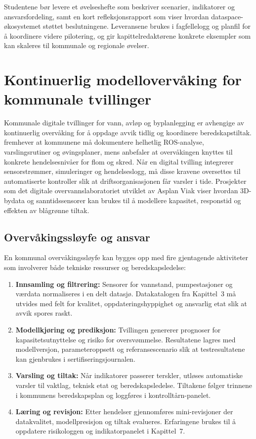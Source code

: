 Studentene bør levere et øvelseshefte som beskriver scenarier, indikatorer og ansvarsfordeling, samt en kort refleksjonsrapport som viser hvordan dataspace-økosystemet støttet beslutningene. Leveransene brukes i fagfellelogg og planfil for å koordinere videre pilotering, og gir kapittelredaktørene konkrete eksempler som kan skaleres til kommunale og regionale øvelser.


\section{Kontinuerlig modellovervåking for kommunale tvillinger}
Kommunale digitale tvillinger for vann, avløp og byplanlegging er avhengige av kontinuerlig overvåking for å oppdage avvik tidlig og koordinere beredskapstiltak. \citet{dsb2022beredskap} fremhever at kommunene må dokumentere helhetlig ROS-analyse, varslingsrutiner og øvingsplaner, mens \citet{nve2022kommunal} anbefaler at overvåkingen knyttes til konkrete hendelsesnivåer for flom og skred. Når en digital tvilling integrerer sensorstrømmer, simuleringer og hendelseslogg, må disse kravene oversettes til automatiserte kontroller slik at driftsorganisasjonen får varsler i tide. Prosjekter som det digitale overvannslaboratoriet utviklet av Asplan Viak viser hvordan 3D-bydata og sanntidssensorer kan brukes til å modellere kapasitet, responstid og effekten av blågrønne tiltak.\citep{asplan2023overvannslab}

\subsection{Overvåkingssløyfe og ansvar}
En kommunal overvåkingssløyfe kan bygges opp med fire gjentagende aktiviteter som involverer både tekniske ressurser og beredskapsledelse:
\begin{enumerate}
    \item \textbf{Innsamling og filtrering:} Sensorer for vannstand, pumpestasjoner og værdata normaliseres i en delt datasjø. Datakatalogen fra Kapittel~3 må utvides med felt for kvalitet, oppdateringshyppighet og ansvarlig etat slik at avvik spores raskt.\citep{nve2022kommunal}
    \item \textbf{Modellkjøring og prediksjon:} Tvillingen genererer prognoser for kapasitetsutnyttelse og risiko for oversvømmelse. Resultatene lagres med modellversjon, parameteroppsett og referansescenario slik at testresultatene kan gjenbrukes i sertifiseringsjournalen.
    \item \textbf{Varsling og tiltak:} Når indikatorer passerer terskler, utløses automatiske varsler til vaktlag, teknisk etat og beredskapsledelse. Tiltakene følger trinnene i kommunens beredskapsplan og loggføres i kontrolltårn-panelet.\citep{dsb2022beredskap}
    \item \textbf{Læring og revisjon:} Etter hendelser gjennomføres mini-revisjoner der datakvalitet, modellpresisjon og tiltak evalueres. Erfaringene brukes til å oppdatere risikologgen og indikatorpanelet i Kapittel~7.
\end{enumerate}


